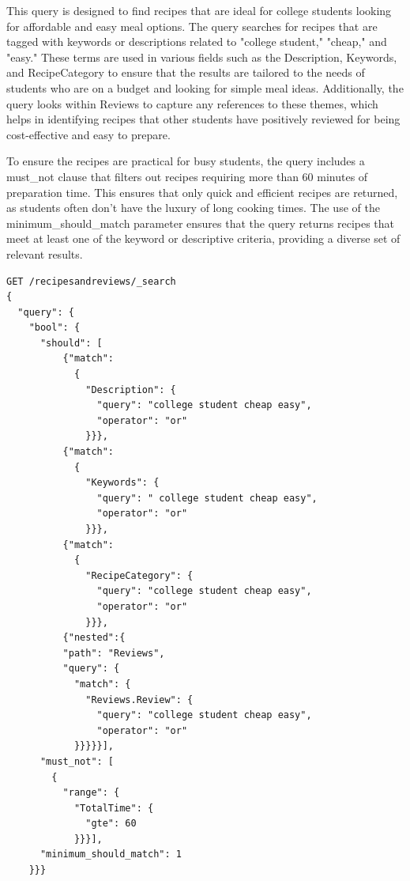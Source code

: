 \begin{enumerate}
    This query is designed to find recipes that are ideal for college students looking for affordable and easy meal options. The query searches for recipes that are tagged with keywords or descriptions related to "college student," "cheap," and "easy." These terms are used in various fields such as the Description, Keywords, and RecipeCategory to ensure that the results are tailored to the needs of students who are on a budget and looking for simple meal ideas. Additionally, the query looks within Reviews to capture any references to these themes, which helps in identifying recipes that other students have positively reviewed for being cost-effective and easy to prepare.

    To ensure the recipes are practical for busy students, the query includes a must\_not clause that filters out recipes requiring more than 60 minutes of preparation time. This ensures that only quick and efficient recipes are returned, as students often don’t have the luxury of long cooking times. The use of the minimum\_should\_match parameter ensures that the query returns recipes that meet at least one of the keyword or descriptive criteria, providing a diverse set of relevant results.

    \begin{verbatim}
GET /recipesandreviews/_search
{
  "query": {
    "bool": {
      "should": [
          {"match":
            {
              "Description": {
                "query": "college student cheap easy",
                "operator": "or"
              }}},
          {"match":
            {
              "Keywords": {
                "query": " college student cheap easy",
                "operator": "or"
              }}},
          {"match":
            {
              "RecipeCategory": {
                "query": "college student cheap easy",
                "operator": "or"
              }}},
          {"nested":{
          "path": "Reviews",
          "query": {
            "match": {
              "Reviews.Review": {
                "query": "college student cheap easy",
                "operator": "or"
            }}}}}],
      "must_not": [
        {
          "range": {
            "TotalTime": {
              "gte": 60
            }}}],
      "minimum_should_match": 1
    }}}
    \end{verbatim}


\end{enumerate}
